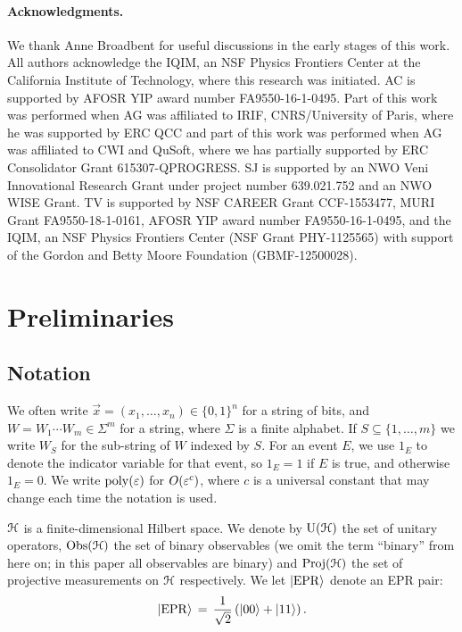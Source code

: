 \paragraph{Acknowledgments.} We thank Anne Broadbent for useful discussions in the early stages of this work. All authors acknowledge the IQIM, an NSF Physics Frontiers Center at the California Institute of Technology, where this research was initiated.
AC is supported by AFOSR YIP award number FA9550-16-1-0495.
Part of this work was performed when AG was affiliated to IRIF, CNRS/University of Paris, where he was supported by ERC QCC and part of this work was performed when AG was affiliated to CWI and QuSoft, where we has partially supported by ERC Consolidator Grant 615307-QPROGRESS.
SJ is supported by an NWO Veni Innovational Research Grant under project number 639.021.752 and an NWO WISE Grant.
TV is supported by NSF CAREER Grant CCF-1553477, MURI Grant FA9550-18-1-0161, AFOSR YIP award number FA9550-16-1-0495, and the IQIM, an NSF Physics Frontiers Center (NSF Grant PHY-1125565) with support of the Gordon and Betty Moore Foundation (GBMF-12500028).



\section{Preliminaries}\label{sec:prelim}


\subsection{Notation}
\label{sec:prelim-notation}

We often write $\vec{x} =(x_1,\ldots,x_n)\in \{0,1\}^n$ for a string of bits, and $W=W_1\cdots W_m\in\Sigma^m$ for a string, where $\Sigma$ is a finite alphabet. If $S\subseteq \{1,\ldots,m\}$ we write $W_S$ for the sub-string of $W$ indexed by $S$. For an event $E$, we use $1_{E}$ to denote the indicator variable for that event, so $1_E=1$ if $E$ is true, and otherwise $1_E=0$. We write $\operatorname{poly}(\varepsilon)$ for $O(\varepsilon^c)$, where $c$ is a universal constant that may change each time the notation is used. 

$\mathcal{H}$ is a finite-dimensional Hilbert space.  We denote by $\mathrm{U}(\mathcal{H})$ the set of unitary operators, $\mathrm{Obs}(\mathcal{H})$ the set of binary observables (we omit the term ``binary'' from here on; in this paper all observables are binary) and $\mathrm{Proj}(\mathcal{H})$ the set of projective measurements on $\mathcal{H}$ respectively.  
We let $|{\rm EPR}\rangle$ denote an EPR pair: 
$$|{\rm EPR}\rangle\,=\,\frac{1}{\sqrt{2}}\left(|00\rangle+|11\rangle\right).$$


